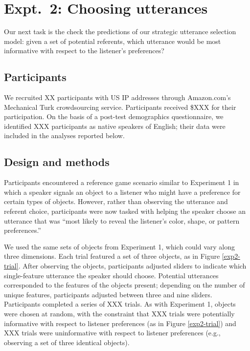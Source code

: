 \documentclass[10pt,a4paper]{article}
\begin{document}

\section{Expt.~2: Choosing utterances}

Our next task is the check the predictions of our strategic utterance selection model: given a set of potential referents, which utterance would be most informative with respect to the listener's preferences?

\subsection{Participants}

We recruited XX participants with US IP addresses through Amazon.com's Mechanical Turk crowdsourcing service. Participants received \$XXX for their participation. On the basis of a post-test demographics questionnaire, we identified XXX participants as native speakers of English; their data were included in the analyses reported below.

\subsection{Design and methods}

Participants encountered a reference game scenario similar to Experiment 1 in which a speaker signals an object to a listener who might have a preference for certain types of objects. However, rather than observing the utterance and referent choice, participants were now tasked with helping the speaker choose an utterance that was ``most likely to reveal the listener's color, shape, or pattern preferences.''

We used the same sets of objects from Experiment 1, which could vary along three dimensions. Each trial featured a set of three objects, as in Figure \ref{exp2-trial}. After observing the objects, participants adjusted sliders to indicate which single-feature utterance the speaker should choose. Potential utterances corresponded to the features of the objects present; depending on the number of unique features, participants adjusted between three and nine sliders. Participants completed a series of XXX trials. As with Experiment 1, objects were chosen at random, with the constraint that XXX trials were potentially informative with respect to listener preferences (as in Figure \ref{exp2-trial}) and XXX trials were uninformative with respect to listener preferences (e.g., observing a set of three identical objects). 
\end{document}
